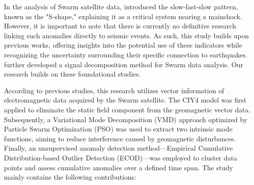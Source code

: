 \documentclass[3p,authoryear,preprint,12pt]{elsarticle}
\begin{document}
In the analysis of Swarm satellite data, \cite{desantisPotentialEarthquakePrecursory2017} introduced the slow-fast-slow pattern, known as the "S-shape," explaining it as a critical system nearing a mainshock. 
{However, it is important to note that there is currently no definitive research linking such anomalies directly to seismic events. As such, this study builds upon previous works, offering insights into the potential use of these indicators while recognizing the uncertainty surrounding their specific connection to earthquakes.}
 \cite{fanAnalysisSwarmSatellite2022a} further developed a signal decomposition method for Swarm data analysis. Our research builds on these foundational studies.

{According to previous studies, this research utilizes vector information of electromagnetic data acquired by the Swarm satellite. The CIY4 model was first applied to eliminate the static field component from the geomagnetic vector data. Subsequently, a Variational Mode Decomposition (VMD) approach optimized by Particle Swarm Optimization (PSO) was used to extract two intrinsic mode functions, aiming to reduce interference caused by geomagnetic disturbances. Finally, an unsupervised anomaly detection method—Empirical Cumulative Distribution-based Outlier Detection (ECOD)—was employed to cluster data points and assess cumulative anomalies over a defined time span.}
The study mainly contains the following contributions:
\end{document}
